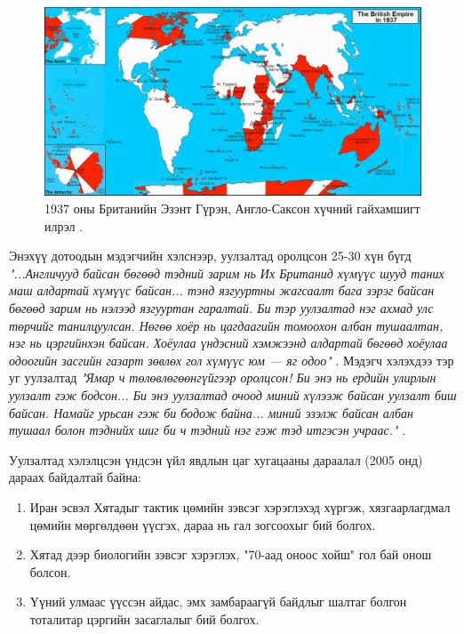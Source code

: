 \documentclass[10pt,twocolumn,letterpaper]{article}
\begin{document}
\begin{figure}[t]
\begin{center}
\includegraphics[width=1\textwidth]{british.jpg}
\end{center}
   \caption{1937 оны Британийн Эзэнт Гүрэн, Англо-Саксон хүчний гайхамшигт илрэл \cite{14}.}
   \label{fig:2}
\end{figure}
Энэхүү дотоодын мэдэгчийн хэлснээр, уулзалтад оролцсон 25-30 хүн бүгд \textit{"...Англичууд байсан бөгөөд тэдний зарим нь Их Британид хүмүүс шууд таних маш алдартай хүмүүс байсан... тэнд язгууртны жагсаалт бага зэрэг байсан бөгөөд зарим нь нэлээд язгууртан гаралтай. Би тэр уулзалтад нэг ахмад улс төрчийг танилцуулсан. Нөгөө хоёр нь цагдаагийн томоохон албан тушаалтан, нэг нь цэргийнхэн байсан. Хоёулаа үндэсний хэмжээнд алдартай бөгөөд хоёулаа одоогийн засгийн газарт зөвлөх гол хүмүүс юм — яг одоо"} \cite{4}. Мэдэгч хэлэхдээ тэр уг уулзалтад \textit{"Ямар ч төлөвлөгөөнгүйгээр оролцсон! Би энэ нь ердийн улирлын уулзалт гэж бодсон... Би энэ уулзалтад очоод миний хүлээж байсан уулзалт биш байсан. Намайг урьсан гэж би бодож байна... миний эзэлж байсан албан тушаал болон тэднийх шиг би ч тэдний нэг гэж тэд итгэсэн учраас."} \cite{4}.

Уулзалтад хэлэлцсэн үндсэн үйл явдлын цаг хугацааны дараалал (2005 онд) дараах байдалтай байна:

\begin{flushleft}
\begin{enumerate}
    \item Иран эсвэл Хятадыг тактик цөмийн зэвсэг хэрэглэхэд хүргэж, хязгаарлагдмал цөмийн мөргөлдөөн үүсгэх, дараа нь гал зогсоохыг бий болгох.
    \item Хятад дээр биологийн зэвсэг хэрэглэх, "70-аад оноос хойш" гол бай онош болсон.
    \item Үүний улмаас үүссэн айдас, эмх замбараагүй байдлыг шалтаг болгон тоталитар цэргийн засаглалыг бий болгох.
\end{enumerate}
\end{flushleft}
\end{document}
